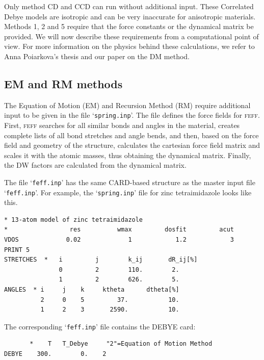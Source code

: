 \documentclass[11pt,oneside]{report} %
\renewcommand{\htmlref}[2]{\hyperlink{#2}{#1}}
\newcommand{\program}[1]{\textsc{#1}}
\newcommand{\feff}{\program{feff}}
\newcommand{\file}[1]{`\texttt{#1}'}
\renewcommand{\htmlref}[2]{{#1}} %
\begin{document}
Only method CD and CCD can run without additional input.  These Correlated Debye models are isotropic and can be very inaccurate for anisotropic materials.
Methods 1, 2 and 5 require that
the force constants or the dynamical matrix be provided.  We will now describe these requirements from a computational point of view.  For more information on the physics
behind these calculations, we refer to \htmlref{Anna Poiarkova's thesis}{http://leonardo.phys.washington.edu/feff/papers/dissertations/thesis_poiarkova.ps} and our \htmlref{paper on the DM method}{http://leonardo.phys.washington.edu/feff/papers/fdv-ab-initio-dw-factors.pdf}.  

\subsection{EM and RM methods}
The Equation of Motion (EM) and Recursion Method (RM) require additional input to be given in the file \file{spring.inp}.  
The file defines the force fields for {\feff}.  First, {\feff} searches for all similar bonds and angles in the material, creates complete lists of all bond stretches and angle bends, and then, based on the force field and geometry of the structure, calculates the cartesian force field matrix and scales it with the atomic masses, thus obtaining the dynamical matrix.  Finally, the DW factors are calculated from the dynamical matrix.

The file \file{feff.inp} has the same CARD-based structure as the master input file \file{feff.inp}.  For example, the \file{spring.inp} file for zinc tetraimidazole looks like this.
\begin{verbatim}
* 13-atom model of zinc tetraimidazole
*                 res          wmax         dosfit         acut
VDOS             0.02             1            1.2            3
PRINT 5
STRETCHES  *   i         j        k_ij       dR_ij[%]
               0         2        110.        2.
               1         2        626.        5.
ANGLES  * i     j    k     ktheta      dtheta[%]
          2     0    5         37.           10.
          1     2    3       2590.           10.
\end{verbatim}
The corresponding \file{feff.inp} file contains the DEBYE card:
\begin{verbatim}
       *    T   T_Debye     "2"=Equation of Motion Method
DEBYE    300.        0.    2    
\end{verbatim}
\end{document}
